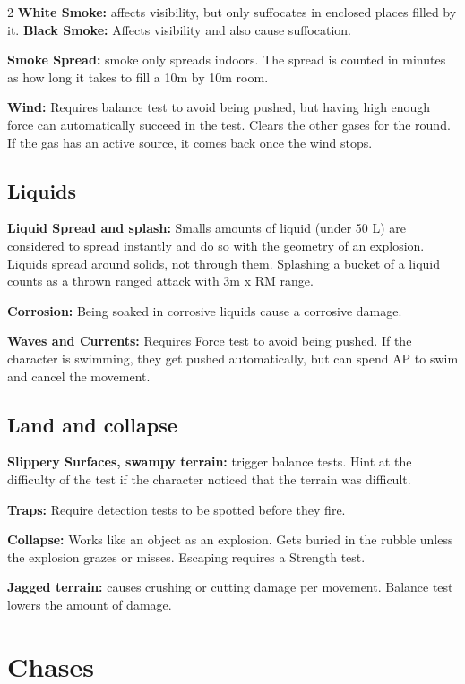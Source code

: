 \begin{multicols}{2}
\textbf{White Smoke:} affects visibility, but only suffocates in enclosed places filled by it. \textbf{Black Smoke:} Affects visibility and also cause suffocation.

\textbf{Smoke Spread:} smoke only spreads indoors. The spread is counted in minutes as how long it takes to fill a 10m by 10m room.

\textbf{Wind:} Requires balance test to avoid being pushed, but having high enough force can automatically succeed in the test. Clears the other gases for the round. If the gas has an active source, it comes back once the wind stops.

\subsection{Liquids}

\textbf{Liquid Spread and splash:} Smalls amounts of liquid (under 50 L) are considered to spread instantly and do so with the geometry of an explosion. Liquids spread around solids, not through them. Splashing a bucket of a liquid counts as a thrown ranged attack with 3m x RM range.  

\textbf{Corrosion:} Being soaked in corrosive liquids cause a corrosive damage.

\textbf{Waves and Currents:} Requires Force test to avoid being pushed. If the character is swimming, they get pushed automatically, but can spend AP to swim and cancel the movement.


\subsection{Land and collapse}

\textbf{Slippery Surfaces, swampy terrain:} trigger balance tests. Hint at the difficulty of the test if the character noticed that the terrain was difficult.

\textbf{Traps:} Require detection tests to be spotted before they fire. 

\textbf{Collapse:} Works like an object as an explosion. Gets buried in the rubble unless the explosion grazes or misses. Escaping requires a Strength test.

\textbf{Jagged terrain:} causes crushing or cutting damage per movement. Balance test lowers the amount of damage.


\section{Chases}


\end{multicols}
